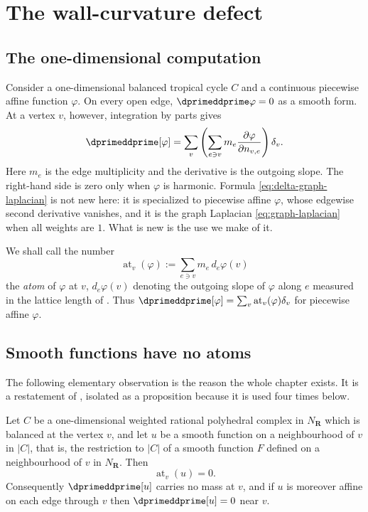 \section{The wall-curvature defect}
\label{sec:ch18-defect}

\subsection{The one-dimensional computation}
\label{sec:ch18-defect-onedim}

Consider a one-dimensional balanced tropical cycle $C$ and a continuous
piecewise affine function $\varphi$.  On every open edge,
$\dprimeddprime\varphi=0$ as a smooth form.  At a vertex $v$, however, integration
by parts gives
\begin{equation}
 \dprimeddprime[\varphi]
   =\sum_v\left(\sum_{e\ni v}m_e
             \frac{\partial\varphi}{\partial n_{v,e}}\right)\delta_v.
\label{eq:delta-graph-laplacian}
\end{equation}
Here $m_e$ is the edge multiplicity and the derivative is the outgoing
slope.  The right-hand side is zero only when $\varphi$ is harmonic.
Formula \eqref{eq:delta-graph-laplacian} is not new here: it is
 specialized to piecewise affine $\varphi$, whose
edgewise second derivative vanishes, and it is the graph Laplacian
\eqref{eq:graph-laplacian} when all weights are $1$.  What is new is the use
we make of it.

We shall call the number
\begin{equation}
\label{eq:ch18-atom}
 \operatorname{at}_v(\varphi)
 :=\sum_{e\ni v}m_e\,d_e\varphi(v)
\end{equation}
the \emph{atom} of $\varphi$ at $v$, $d_e\varphi(v)$ denoting the outgoing
slope of $\varphi$ along $e$ measured in the lattice length of
.  Thus
$\dprimeddprime[\varphi]=\sum_v\operatorname{at}_v(\varphi)\delta_v$ for
piecewise affine $\varphi$.

\subsection{Smooth functions have no atoms}
\label{sec:ch18-zero-atom}

The following elementary observation is the reason the whole chapter exists.
It is a restatement of , isolated as a
proposition because it is used four times below.

\begin{proposition}
\label{prop:ch18-smooth-zero-atom}
Let $C$ be a one-dimensional weighted rational polyhedral complex in
$N_{\mathbf R}$ which is balanced at the vertex $v$, and let $u$ be a smooth
function on a neighbourhood of $v$ in $|C|$, that is, the restriction to
$|C|$ of a smooth function $F$ defined on a neighbourhood of $v$ in
$N_{\mathbf R}$.  Then
\[
 \operatorname{at}_v(u)=0 .
\]
Consequently $\dprimeddprime[u]$ carries no mass at $v$, and if $u$ is
moreover affine on each edge through $v$ then $\dprimeddprime[u]=0$ near
$v$.
\end{proposition}

